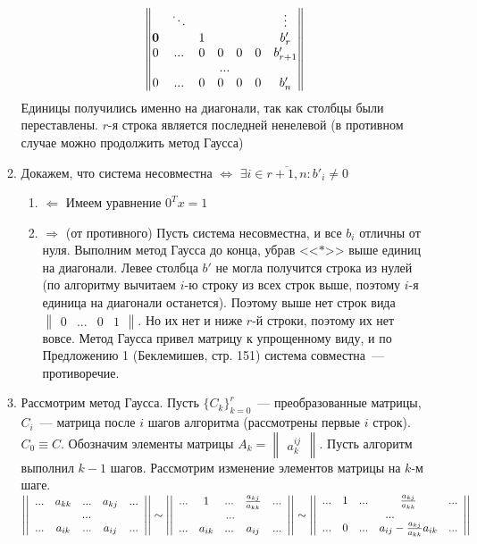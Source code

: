 \documentclass[a4paper]{article}
\newcommand{\matrixl}{\left|\left|}
\newcommand{\matrixr}{\right|\right|}
\begin{document}
\begin{enumerate}
\begin{enumerate}
$$\begin{Vmatrix}
 & \ddots & & & && \vdots\\
\mbox{\bf{0}} & & 1& & & & b'_r\\
0 & ... & 0 & 0 & 0 & 0 & b'_{r+1}\\
\multicolumn{7}{c}{...}\\
0 & ... & 0 & 0 & 0 & 0 & b'_{n}
\end{Vmatrix}
$$
Единицы получились именно на диагонали, так как столбцы были переставлены. $r$-я строка является последней ненелевой (в противном случае можно продолжить метод Гаусса)
\item Докажем, что система несовместна $\Leftrightarrow$ $\exists i\in\overline{r+1,n}\colon b'_{i}\neq 0$\begin{enumerate}
\item $\boxed{\Leftarrow}$ Имеем уравнение $0^T x=1$
\item $\boxed{\Rightarrow}$ (от противного) Пусть система несовместна, и все $b_i$ отличны от нуля. Выполним метод Гаусса до конца, убрав <<$*$>> выше единиц на диагонали. Левее столбца $b'$ не могла получится строка из нулей (по алгоритму вычитаем $i$-ю строку из всех строк выше, поэтому $i$-я единица на диагонали останется). Поэтому выше нет строк вида $\begin{Vmatrix}
0 & ... & 0 & 1
\end{Vmatrix}$. Но их нет и ниже $r$-й строки, поэтому их нет вовсе. Метод Гаусса привел матрицу к упрощенному виду, и по Предложению 1 (Беклемишев, стр. 151) система совместна~--- противоречие.
\end{enumerate}
\item Рассмотрим метод Гаусса. Пусть $\{C_k\}_{k=0}^{r}$~--- преобразованные матрицы, $C_i$~--- матрица после $i$ шагов алгоритма (рассмотрены первые $i$ строк). $C_0\equiv C$. Обозначим элементы матрицы $A_k=\begin{Vmatrix}a_k^{ij}\end{Vmatrix}$. Пусть алгоритм выполнил $k-1$ шагов. Рассмотрим изменение элементов матрицы на $k$-м шаге.\newline
$\matrixl
\begin{array}{ccccc}
... & a_{kk} & ... & a_{kj} & ...\\
\multicolumn{5}{c}{...}\\
... & a_{ik} & ... & a_{ij} & ...\\
\end{array}
\matrixr\sim
\matrixl
\begin{array}{ccccc}
... & 1 & ... & \frac{a_{kj}}{a_{kk}} & ...\\
\multicolumn{5}{c}{...}\\
... & a_{ik} & ... & a_{ij} & ...\\
\end{array}
\matrixr\sim
\matrixl
\begin{array}{ccccc}
... & 1 & ... & \frac{a_{kj}}{a_{kk}} & ...\\
\multicolumn{5}{c}{...}\\
... & 0 & ... & a_{ij}-\frac{a_{kj}}{a_{kk}}a_{ik} & ...\\
\end{array}
\matrixr
$


\end{enumerate}
\end{enumerate}
\end{document}
